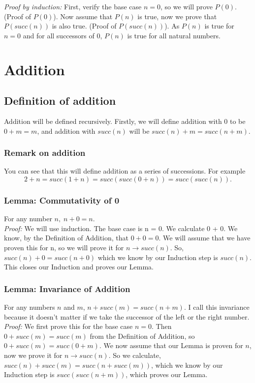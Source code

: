 \documentclass[]{scrbook}
\begin{document}
\textit{Proof by induction:} First, verify the base case $n=0$, so we will prove $P(0)$. (Proof of $P(0)$). Now assume that $P(n)$ is true, now we prove that $P(succ(n))$ is also true. (Proof of $P(succ(n))$). As $P(n)$ is true for $n=0$ and for all successors of 0, $P(n)$ is true for all natural numbers.

\section{Addition}

\subsection{Definition of addition}
Addition will be defined recursively. Firstly, we will define addition with 0 to be $0 + m= m$, and addition with $succ(n)$ will be $succ(n) + m = succ(n+m)$.

\subsubsection*{Remark on addition}
You can see that this will define addition as a series of successions. For example
\begin{equation}
	2 + n = succ(1+n) = succ(succ(0+n)) = succ(succ(n)).
\end{equation}

\subsubsection*{Lemma: Commutativity of 0}
For any number $n,\; n + 0 = n$.\\
\textit{Proof:} We will use induction. The base case is n = 0. We calculate 0 + 0. We know, by the Definition of Addition, that $0+0 = 0$. We will assume that we have proven this for n, so we will prove it for $n\rightarrow succ(n)$. So, $succ(n) + 0 = succ(n + 0)$ which we know by our Induction step is $succ(n)$. This closes our Induction and proves our Lemma.

\subsubsection*{Lemma: Invariance of Addition}
For any numbers $n$ and $m$, $n + succ(m) = succ(n+m)$. I call this invariance because it doesn't matter if we take the successor of the left or the right number.\\
\textit{Proof:} We first prove this for the base case $n=0$. Then $0 + succ(m) = succ(m)$ from the Definition of Addition, so $0 + succ(m) = succ(0 + m)$. We now assume that our Lemma is proven for $n$, now we prove it for $n\rightarrow succ(n)$. So we calculate, $succ(n) + succ(m) = succ(n + succ(m))$, which we know by our Induction step is $succ(succ(n + m))$, which proves our Lemma.
\end{document}
